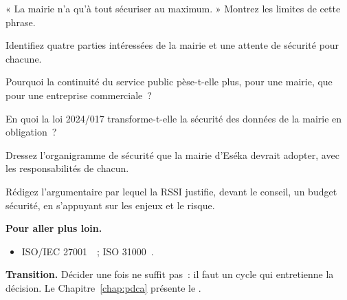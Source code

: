 \begin{boxexo}[title={\ding{45}\quad Exercice~2.5. Décider \niveaumoyen}]
« La mairie n'a qu'à tout sécuriser au maximum. » Montrez les limites de cette
phrase.
\end{boxexo}

\begin{boxexo}[title={\ding{45}\quad Exercice~2.6. Parties intéressées \niveaumoyen}]
Identifiez quatre parties intéressées de la mairie et une attente de sécurité
pour chacune.
\end{boxexo}

\begin{boxexo}[title={\ding{45}\quad Exercice~2.7. Continuité publique \niveaumoyen}]
Pourquoi la continuité du service public pèse-t-elle plus, pour une mairie,
que pour une entreprise commerciale~?
\end{boxexo}

\begin{boxexo}[title={\ding{45}\quad Exercice~2.8. Obligation légale \niveaumoyen}]
En quoi la loi 2024/017 transforme-t-elle la sécurité des données de la mairie
en obligation~?
\end{boxexo}

\begin{boxexo}[title={\ding{45}\quad Exercice~2.9. Cartographie des acteurs \niveauexpert}]
Dressez l'organigramme de sécurité que la mairie d'Eséka devrait adopter, avec
les responsabilités de chacun.
\end{boxexo}

\begin{boxexo}[title={\ding{45}\quad Exercice~2.10. Argumentaire budgétaire \niveauexpert}]
Rédigez l'argumentaire par lequel la RSSI justifie, devant le conseil, un
budget sécurité, en s'appuyant sur les enjeux et le risque.
\end{boxexo}

\bigskip

\begin{boxinfo}
\textbf{Pour aller plus loin.}
\begin{itemize}
    \item ISO/IEC 27001~\cite{iso27001}~; ISO 31000~\cite{iso31000}.
\end{itemize}
\end{boxinfo}

\begin{boxinfo}
\textbf{Transition.} Décider une fois ne suffit pas~: il faut un cycle qui
entretienne la décision. Le Chapitre~\ref{chap:pdca} présente le .
\end{boxinfo}
